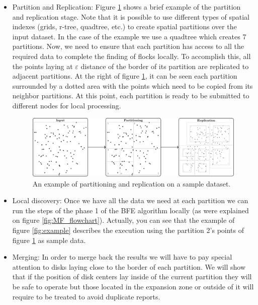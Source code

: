 \begin{itemize}

\item Partition and Replication: Figure \ref{fig:partrep} shows a brief example of the partition and replication stage.  Note that it is possible to use different types of spatial indexes (grids, r-tree, quadtree, etc.) to create spatial partitions over the input dataset.  In the case of the example we use a quadtree which creates 7 partitions.  Now, we need to ensure that each partition has access to all the required data to complete the finding of flocks locally.  To accomplish this, all the points laying at $\varepsilon$ distance of the border of its partition are replicated to adjacent partitions.  At the right of figure \ref{fig:partrep},  it can be seen each partition surrounded by a dotted area with the points which need to be copied from its neighbor partitions.  At this point, each partition is ready to be submitted to different nodes for local processing.

\begin{figure}
    \centering
    \includegraphics[width=\linewidth]{figures/MF_stages/P123}
    \caption{An example of partitioning and replication on a sample dataset.}\label{fig:partrep}
\end{figure}

\item Local discovery: Once we have all the data we need at each partition we can run the steps of the phase 1 of the BFE algorithm locally (as were explained on figure \ref{fig:MF_flowchart}).  Actually, you can see that the example of figure \ref{fig:example} describes the execution using the partition 2's points of figure \ref{fig:partrep} as sample data.

\item Merging:  In order to merge back the results we will have to pay special attention to disks laying close to the border of each partition.  We will show that if the position of disk centers lay inside of the current partition they will be safe to operate but those located in the expansion zone or outside of it will require to be treated to avoid duplicate reports.  


\end{itemize}
